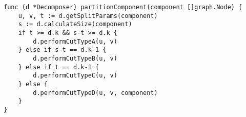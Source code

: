 \begin{lstlisting}[caption=Partition cutting,label=lst:decompose_partition,float,floatplacement=H]
func (d *Decomposer) partitionComponent(component []graph.Node) {
    u, v, t := d.getSplitParams(component)
    s := d.calculateSize(component)
    if t >= d.k && s-t >= d.k {
        d.performCutTypeA(u, v)
    } else if s-t == d.k-1 {
        d.performCutTypeB(u, v)
    } else if t == d.k-1 {
        d.performCutTypeC(u, v)
    } else {
        d.performCutTypeD(u, v, component)
    }
}
\end{lstlisting}